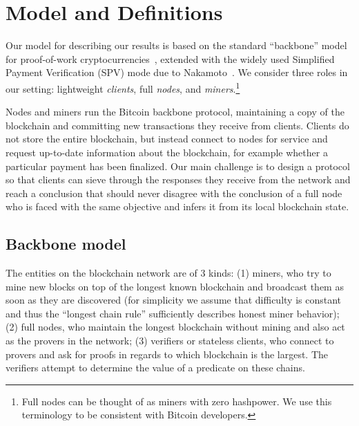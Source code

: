 \section{Model and Definitions}
\label{sec.model}
Our model for describing our results is based on the standard ``backbone'' model
for proof-of-work cryptocurrencies~\cite{backbone}, extended with the widely
used Simplified Payment Verification (SPV) mode due to Nakamoto~\cite{bitcoin}.
We consider three roles in our setting: lightweight \emph{clients},  full
\emph{nodes}, and \emph{miners}.\footnote{Full nodes can be thought of as miners
with zero hashpower. We use this terminology to be consistent with Bitcoin
developers.}

Nodes and miners run the Bitcoin backbone protocol, maintaining a copy of the
blockchain and committing new transactions they receive from clients. Clients do
not store the entire blockchain, but instead connect to nodes for service and
request up-to-date information about the blockchain, for example whether a
particular payment has been finalized. Our main challenge is to design a
protocol so that clients can sieve through  the responses they receive from the
network and reach a conclusion that should never disagree with the conclusion of
a full  node who is faced with the same objective and infers it from its local
blockchain  state.

\subsection{Backbone model}


The entities on the blockchain network are of 3 kinds: (1) miners, who
try to mine new blocks on top of the longest known blockchain and broadcast them
as soon as they are discovered (for simplicity we assume that difficulty
is constant and thus the ``longest chain rule'' sufficiently describes honest miner behavior); (2) full nodes, who maintain the longest
blockchain without mining and also act as the provers in the network; (3)
verifiers or stateless clients, who connect to provers and ask for proofs in
regards to which blockchain is the largest. The verifiers attempt to determine
the value of a predicate on these chains.

